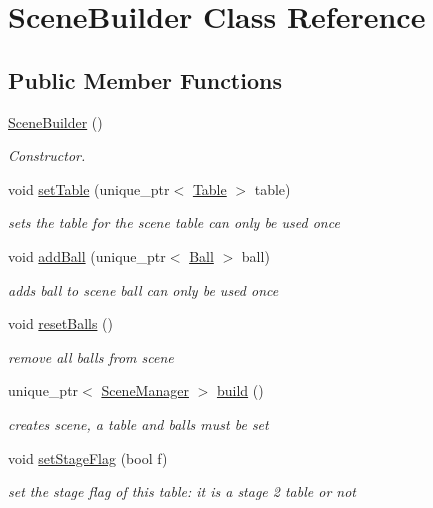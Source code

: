 \hypertarget{class_scene_builder}{}\section{Scene\+Builder Class Reference}
\label{class_scene_builder}
\subsection*{Public Member Functions}
\begin{DoxyCompactItemize}
\item 
\mbox{\label{class_scene_builder_a91be5ca7f12e7493ed45333d55d3aaae}} 
\mbox{\hyperlink{class_scene_builder_a91be5ca7f12e7493ed45333d55d3aaae}{Scene\+Builder}} ()
\begin{DoxyCompactList}\small\item\em Constructor. \end{DoxyCompactList}\item 
void \mbox{\hyperlink{class_scene_builder_a882fc4e2eff2017ec95503883a2af866}{set\+Table}} (unique\+\_\+ptr$<$ \mbox{\hyperlink{class_table}{Table}} $>$ table)
\begin{DoxyCompactList}\small\item\em sets the table for the scene table can only be used once \end{DoxyCompactList}\item 
void \mbox{\hyperlink{class_scene_builder_acd9bf7b1987bf61c8e6ef0a6f13061ee}{add\+Ball}} (unique\+\_\+ptr$<$ \mbox{\hyperlink{class_ball}{Ball}} $>$ ball)
\begin{DoxyCompactList}\small\item\em adds ball to scene ball can only be used once \end{DoxyCompactList}\item 
\mbox{\label{class_scene_builder_ae667126b6b60375ac506fd538e0b1eab}} 
void \mbox{\hyperlink{class_scene_builder_ae667126b6b60375ac506fd538e0b1eab}{reset\+Balls}} ()
\begin{DoxyCompactList}\small\item\em remove all balls from scene \end{DoxyCompactList}\item 
unique\+\_\+ptr$<$ \mbox{\hyperlink{class_scene_manager}{Scene\+Manager}} $>$ \mbox{\hyperlink{class_scene_builder_afb796818b78d4a51c256216791cf7fe1}{build}} ()
\begin{DoxyCompactList}\small\item\em creates scene, a table and balls must be set \end{DoxyCompactList}\item 
void \mbox{\hyperlink{class_scene_builder_a62dd1cf314cf0b04cec2435a3c77c281}{set\+Stage\+Flag}} (bool f)
\begin{DoxyCompactList}\small\item\em set the stage flag of this table\+: it is a stage 2 table or not \end{DoxyCompactList}\end{DoxyCompactItemize}


